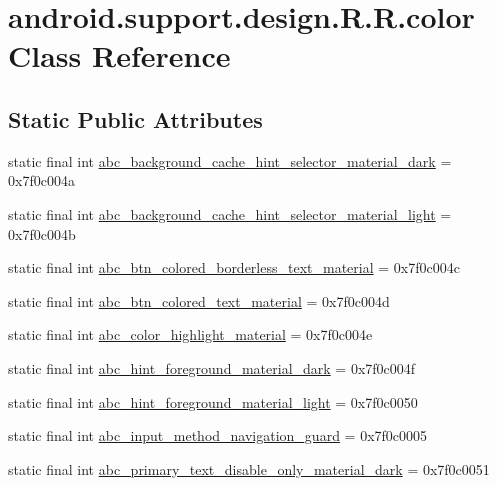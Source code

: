 \hypertarget{classandroid_1_1support_1_1design_1_1_r_1_1color}{
\section{android.support.design.R.R.color Class Reference}
\label{classandroid_1_1support_1_1design_1_1_r_1_1color}
}
\subsection*{Static Public Attributes}
\begin{CompactItemize}
\item 
static final int \hyperlink{classandroid_1_1support_1_1design_1_1_r_1_1color_e8891fe8d5f815022d9be6eb16448e8c}{abc\_\-background\_\-cache\_\-hint\_\-selector\_\-material\_\-dark} = 0x7f0c004a
\item 
static final int \hyperlink{classandroid_1_1support_1_1design_1_1_r_1_1color_b1f70f48a789edbb80333be7ceffb068}{abc\_\-background\_\-cache\_\-hint\_\-selector\_\-material\_\-light} = 0x7f0c004b
\item 
static final int \hyperlink{classandroid_1_1support_1_1design_1_1_r_1_1color_cedaee6e0e5fcd9494b0cc975c60d4c6}{abc\_\-btn\_\-colored\_\-borderless\_\-text\_\-material} = 0x7f0c004c
\item 
static final int \hyperlink{classandroid_1_1support_1_1design_1_1_r_1_1color_f15af11232ab9bd77a4821b1934f7d2d}{abc\_\-btn\_\-colored\_\-text\_\-material} = 0x7f0c004d
\item 
static final int \hyperlink{classandroid_1_1support_1_1design_1_1_r_1_1color_b6e57165483c08395ad193d19d945fff}{abc\_\-color\_\-highlight\_\-material} = 0x7f0c004e
\item 
static final int \hyperlink{classandroid_1_1support_1_1design_1_1_r_1_1color_5ee3a75e312bbb576db3323120c3eb5d}{abc\_\-hint\_\-foreground\_\-material\_\-dark} = 0x7f0c004f
\item 
static final int \hyperlink{classandroid_1_1support_1_1design_1_1_r_1_1color_6de37cb83451cc9f1161ddee7a2cd83c}{abc\_\-hint\_\-foreground\_\-material\_\-light} = 0x7f0c0050
\item 
static final int \hyperlink{classandroid_1_1support_1_1design_1_1_r_1_1color_cca804e5d0929b835908715ca09d5850}{abc\_\-input\_\-method\_\-navigation\_\-guard} = 0x7f0c0005
\item 
static final int \hyperlink{classandroid_1_1support_1_1design_1_1_r_1_1color_c16ba03bd3d88b869931cf5f6229c319}{abc\_\-primary\_\-text\_\-disable\_\-only\_\-material\_\-dark} = 0x7f0c0051

\end{CompactItemize}
